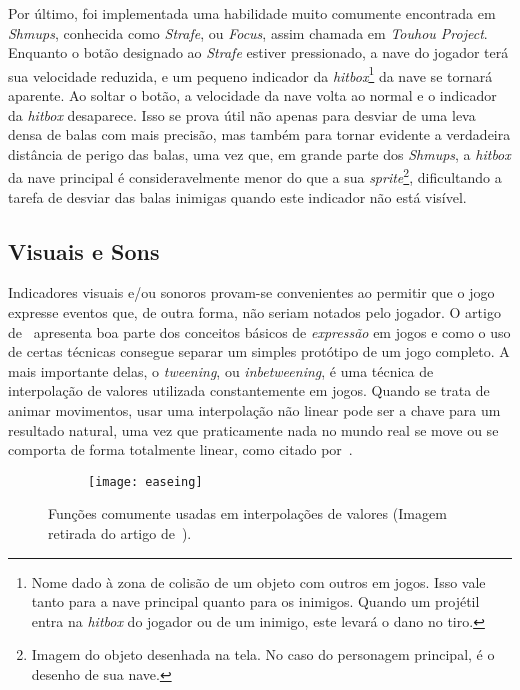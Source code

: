 Por último, foi implementada uma habilidade muito comumente encontrada em \textit{Shmups}, conhecida como \textit{Strafe}, ou \textit{Focus}, assim chamada em \textit{Touhou Project}. Enquanto o botão designado ao \textit{Strafe} estiver pressionado, a nave do jogador terá sua velocidade reduzida, e um pequeno indicador da \textit{hitbox}\footnote{
    Nome dado à zona de colisão de um objeto com outros em jogos. Isso vale tanto para a nave principal quanto para os inimigos. Quando um projétil entra na \textit{hitbox} do jogador ou de um inimigo, este levará o dano no tiro.
} da nave se tornará aparente. Ao soltar o botão, a velocidade da nave volta ao normal e o indicador da \textit{hitbox} desaparece. Isso se prova útil não apenas para desviar de uma leva densa de balas com mais precisão, mas também para tornar evidente a verdadeira distância de perigo das balas, uma vez que, em grande parte dos \textit{Shmups}, a \textit{hitbox} da nave principal é consideravelmente menor do que a sua \textit{sprite}\footnote{
    Imagem do objeto desenhada na tela. No caso do personagem principal, é o desenho de sua nave.
}, dificultando a tarefa de desviar das balas inimigas quando este indicador não está visível.

\subsection{Visuais e Sons}

Indicadores visuais e/ou sonoros provam-se convenientes ao permitir que o jogo expresse eventos que, de outra forma, não seriam notados pelo jogador. O artigo de~\citet{VideoGameJuice} apresenta boa parte dos conceitos básicos de \textit{expressão} em jogos e como o uso de certas técnicas consegue separar um simples protótipo de um jogo completo. A mais importante delas, o \textit{tweening}, ou \textit{inbetweening}, é uma técnica de interpolação de valores utilizada constantemente em jogos. Quando se trata de animar movimentos, usar uma interpolação não linear pode ser a chave para um resultado natural, uma vez que praticamente nada no mundo real se move ou se comporta de forma totalmente linear, como citado por~\cite{VideoGameJuice}.

\begin{figure}
    \centering

    \begin{subfigure}{.9\textwidth}
        \centering
        \texttt{[image: easeing]}
    \end{subfigure}

    \caption{Funções comumente usadas em interpolações de valores\label{fig:subfigures} (Imagem retirada do artigo de~\cite{VideoGameJuice}).}
\end{figure}

